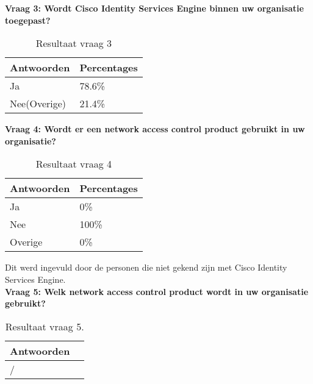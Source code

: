 \textbf{Vraag 3: Wordt Cisco Identity Services Engine binnen uw organisatie toegepast?}

\begin{table}[h!]
	\begin{center}
		\begin{tabular}{|l|l|}
			\hline
		\bf Antwoorden    & \bf Percentages \\ \hline
		Ja      & 78.6\% \\ \hline
		Nee(Overige)     & 21.4\%    \\ \hline
		\end{tabular}
		\caption{Resultaat vraag 3}
	\end{center}
\end{table}


\textbf{Vraag 4: Wordt er een network access control product gebruikt in uw organisatie? }

\begin{table}[h!]
	\begin{center}
		\begin{tabular}{|l|l|}
			\hline
			\bf Antwoorden    & \bf Percentages \\ \hline
			Ja      & 0\%   \\ \hline
			Nee     & 100\% \\ \hline
			Overige & 0\%   \\ \hline
		\end{tabular}
		\caption{Resultaat vraag 4}
	\end{center}
\end{table}

Dit werd ingevuld door de personen die niet gekend zijn met Cisco Identity Services Engine.
\\ \textbf{Vraag 5: Welk network access control product wordt in uw organisatie gebruikt?}

\begin{table}[h!]
	\begin{center}
		\begin{tabular}{|l|l|}
			\hline
			\bf Antwoorden \\ \hline
			/ \\ \hline
		\end{tabular}
		\caption{Resultaat vraag 5.}
	\end{center}
\end{table}


